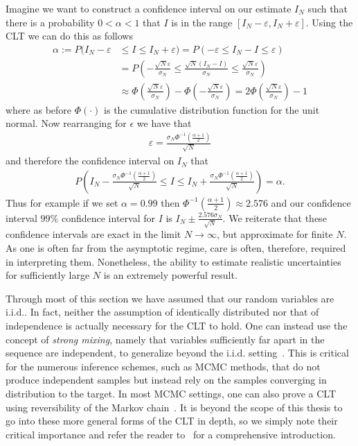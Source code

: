 Imagine we want to construct a confidence interval on our estimate $I_N$ such that there is
a probability $0<\alpha<1$ that $I$ is in the range $[I_N-\varepsilon,I_N+\varepsilon]$.  Using
the CLT we can do this as follows
\begin{align}
	\label{eq:inf:conf-int}
	\alpha := P(I_N-\varepsilon &\le I \le I_N+\varepsilon ) = P(-\varepsilon \le I_N-I \le \varepsilon) \nonumber\\
	&= P\left(-\frac{\sqrt{N}\varepsilon}{\sigma_N}\le \frac{\sqrt{N}\left(I_N-I\right)}{\sigma_N}
				\le\frac{\sqrt{N}\varepsilon}{\sigma_N}\right) \nonumber\\
	&\approx \Phi\left(\frac{\sqrt{N}\varepsilon}{\sigma_N}\right)-
					\Phi\left(-\frac{\sqrt{N}\varepsilon}{\sigma_N}\right) = 2\Phi\left(\frac{\sqrt{N}\varepsilon}{\sigma_N}\right)-1
\end{align}
where as before $\Phi(\cdot)$ is the cumulative distribution function for the unit
normal. Now rearranging for $\epsilon$ we have that
\begin{align}
	\varepsilon = \frac{\sigma_N\Phi^{-1}\left(\frac{\alpha+1}{2}\right)}{\sqrt{N}}
\end{align}
and therefore the confidence interval on $I_N$ that
\begin{align}
P\left(I_N-\frac{\sigma_N\Phi^{-1}\left(\frac{\alpha+1}{2}\right)}{\sqrt{N}} 
	\le I \le I_N+\frac{\sigma_N\Phi^{-1}\left(\frac{\alpha+1}{2}\right)}{\sqrt{N}} \right)  = \alpha.
\end{align}
Thus for example if we set $\alpha=0.99$ then $\Phi^{-1}\left(\frac{\alpha+1}{2}\right)\approx 2.576$
and our confidence interval $99\%$ confidence interval for $I$ is
 $I_N \pm \frac{2.576 \sigma_N}{\sqrt{N}}$.  We reiterate that these confidence intervals are exact
 in the limit $N\to\infty$, but approximate for finite $N$.  As one is often far from the asymptotic
 regime, care is often, therefore, required in interpreting them.  Nonetheless, the ability to
 estimate realistic uncertainties for sufficiently large $N$ is an extremely powerful result.
 
Through most of this section we have assumed that our random variables are i.i.d..
In fact, neither the assumption of identically distributed nor that of independence is actually
necessary for the CLT to hold.  One can instead use the concept of \emph{strong mixing}, namely
that variables sufficiently far apart in the sequence are independent, to generalize beyond the i.i.d.
setting~\citep{jones2004markov}.  This is critical for the numerous \mc inference schemes, 
such as MCMC methods, that
do not produce independent samples but instead rely on the samples converging in distribution
to the target.  In most MCMC settings, one can also prove a CLT using reversibility of
the Markov chain~\citep{kipnis1986central}.
It is beyond the scope of this thesis to go into these more general forms of the CLT
in depth, so we simply note their critical importance and refer the reader to~\cite{durrett2010probability}
for a comprehensive introduction.
